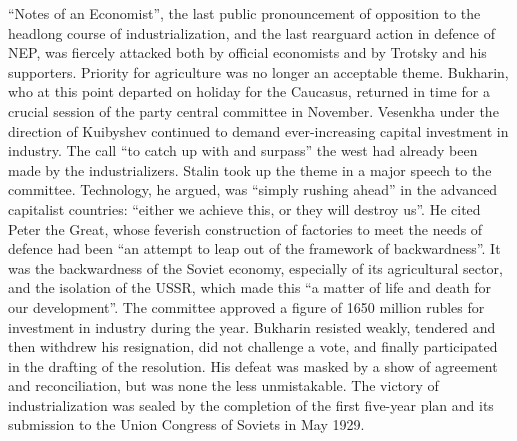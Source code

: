 ``Notes of an Economist'', the last public pronouncement of opposition to the headlong course of industrialization, and the last rearguard action in defence of NEP, was fiercely attacked both by official economists and by Trotsky and his supporters. Priority for agriculture was no longer an acceptable theme. Bukharin, who at this point departed on holiday for the Caucasus, returned in time for a crucial session of the party central committee in November. Vesenkha under the direction of Kuibyshev continued to demand ever-increasing capital investment in industry. The call ``to catch up with and surpass'' the west had already been made by the industrializers. Stalin took up the theme in a major speech to the committee. Technology, he argued, was ``simply rushing ahead'' in the advanced capitalist countries: ``either we achieve this, or they will destroy us''. He cited Peter the Great, whose feverish construction of factories to meet the needs of defence had been ``an attempt to leap out of the framework of backwardness''. It was the backwardness of the Soviet economy, especially of its agricultural sector, and the isolation of the USSR, which made this ``a matter of life and death for our development''. The committee approved a figure of 1650 million rubles for investment in industry during the year. Bukharin resisted weakly, tendered and then withdrew his resignation, did not challenge a vote, and finally participated in the drafting of the resolution. His defeat was masked by a show of agreement and reconciliation, but was none the less unmistakable. The victory of industrialization was sealed by the completion of the first five-year plan and its submission to the Union Congress of Soviets in May 1929.
